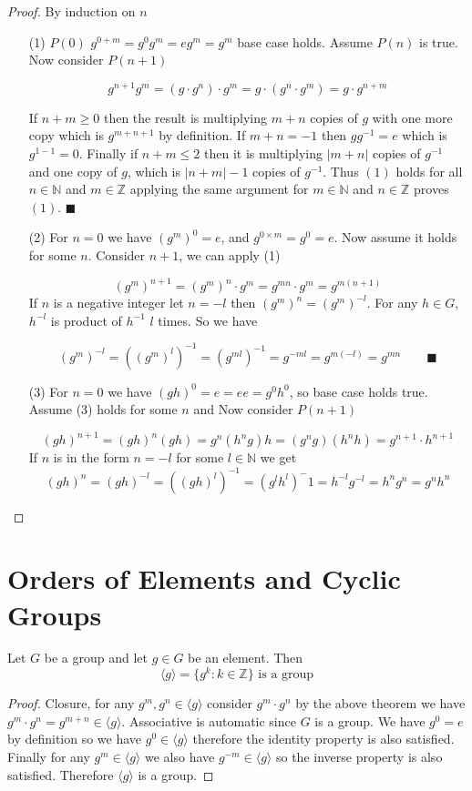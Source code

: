 \documentclass[16pt,a4paper]{article}
\theoremstyle{definition}
\newcommand{\ang}[1]{\langle #1 \rangle}
\begin{document}
\begin{proof}
By induction on $n$
\begin{itemize}
\item[(1)] $P(0)$ $g^{0+m} = g^0 g^m = eg^m = g^m$ base case holds. Assume $P(n)$ is true. Now consider $P(n+1)$

\[g^{n+1}g^m = (g\cdot g^n)\cdot g^m = g\cdot (g^n \cdot g^m)= g\cdot g^{n+m}\]

If $n+m\geq 0$ then the result is multiplying $m+n$ copies of $g$ with one more copy which is $g^{m+n+1}$ by definition. If $m+n=-1$ then $gg^{-1}=e$ which is $g^{1-1}=0$. Finally if $n+m\leq 2$ then it is multiplying $|m+n|$ copies of $g^{-1}$ and one copy of $g$, which is $|n+m|-1$ copies of $g^{-1}$. Thus $(1)$ holds for all $n\in \mathbb{N}$ and $m\in \mathbb{Z}$ applying the same argument for $m\in \mathbb{N}$ and $n\in \mathbb{Z}$ proves $(1)$. $\blacksquare$


\item[(2)] For $n=0$ we have $(g^m)^0 = e$, and $g^{0\times m} = g^0 = e$. Now assume it holds for some $n$. Consider $n+1$, we can apply (1)

\[(g^m)^{n+1} = (g^m)^n\cdot g^m = g^{mn}\cdot g^m = g^{m(n+1)}\]
If $n$ is a negative integer let $n=-l$ then $(g^m)^n = (g^m)^{-l} $. For any $h\in G$, $h^{-l}$ is product of $h^{-1}$ $l$ times. So we have 

\[(g^m)^{-l} = ((g^m)^l)^{-1} = (g^{ml})^{-1} = g^{-ml} = g^{m(-l)} = g^{mn} \qquad \blacksquare\] 





\newpage
\item[(3)] For $n=0$ we have $(gh)^0 = e = ee  = g^0h^0$, so base case holds true. Assume (3) holds for some $n$ and Now consider $P(n+1)$

\[(gh)^{n+1} = (gh)^n (gh) = g^n(h^ng)h= (g^ng)(h^nh) = g^{n+1}\cdot h^{n+1} \]
If $n$ is in the form $n=-l$ for some $l\in \mathbb{N}$ we get
$$(gh)^n = (gh)^{-l} = ((gh)^l)^{-1} = (g^lh^l)^-1 = h^{-l}g^{-l} = h^ng^n = g^nh^n$$


\end{itemize}
\end{proof}


\section{Orders of Elements and Cyclic Groups}

\begin{thm}{}{}
Let $G$ be a group and let $g\in G$ be an element. Then 
\[\ang{g} = \{g^k : k\in \mathbb{Z}\} \text{ is a group}\]

\end{thm}
\begin{proof}
Closure, for any $g^m, g^n \in \ang{g}$ consider $g^m\cdot g^n$ by the above theorem we have $g^m\cdot g^n = g^{m+n} \in \ang{g}$. Associative is automatic since $G$ is a group. We have $g^0 = e$ by definition so we have $g^0 \in \ang{g}$ therefore the identity property is also satisfied. Finally for any $g^m \in \ang{g}$ we also have $g^{-m} \in \ang{g}$ so the inverse property is also satisfied. Therefore $\ang{g}$ is a group. 
\end{proof}
\end{document}
